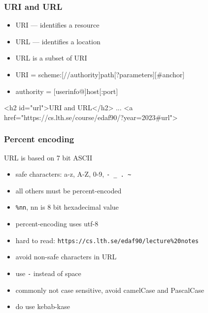 \begin{frame}[fragile]\frametitle{URI and URL}
\color{structure}
\begin{itemize}\color{structure}
  \item URI --- identifies a resource
  \item URL --- identifies a location
  \item URL is a subset of URI
  \item URI = scheme:[//authority]path[?parameters][\#anchor]
  \item authority = [userinfo@]host[:port]
\end{itemize}
\vspace{5mm}
\begin{CodeBox}{}
<h2 id="url">URI and URL</h2>
...
<a href="https://cs.lth.se/course/edaf90/?year=2023#url">
\end{CodeBox}
\end{frame}

\begin{frame}[fragile]\frametitle{Percent encoding}
URL is based on 7 bit ASCII
\begin{itemize}
  \item safe characters: a-z, A-Z, 0-9, \texttt{- \_ . \textasciitilde}
  \item all others must be percent-encoded
  \item \texttt{\%nn}, nn is 8 bit hexadecimal value
  \item percent-encoding uses utf-8
  \item hard to read: \texttt{https://cs.lth.se/edaf90/lecture\%20notes}
  \item avoid non-safe characters in URL
  \item use \texttt{-} instead of space
  \item commonly not case sensitive, avoid camelCase and PascalCase
  \item do use kebab-kase
\end{itemize}
\end{frame}

